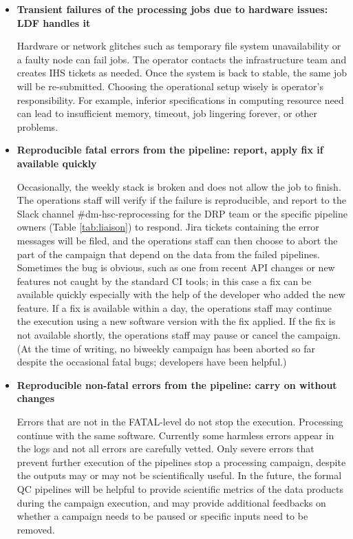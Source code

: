\documentclass[DM,authoryear,toc]{lsstdoc}
\begin{document}
\begin{itemize}
  \item \textbf{Transient failures of the processing jobs due to
  hardware issues: LDF handles it}

  Hardware or network glitches such as temporary file system
  unavailability or a faulty node can fail jobs. The operator
  contacts the infrastructure team and creates IHS tickets as needed.
  Once the system is back to stable, the same job will be re-submitted.
  Choosing the operational setup wisely is operator’s responsibility.
  For example, inferior specifications in computing resource need
  can lead to insufficient memory, timeout, job lingering forever,
  or other problems.

  \item \textbf{Reproducible fatal errors from the pipeline: report,
  apply fix if available quickly}

  Occasionally, the weekly stack is broken and does not allow the job to
  finish. The operations staff will verify if the failure is reproducible, and
  report to the Slack channel \#dm-hsc-reprocessing for the DRP team
  or the specific pipeline owners (Table \ref{tab:liaison})
  to respond. Jira tickets containing the error messages will be
  filed, and the operations staff can then choose to abort the
  part of the campaign that depend on the data from the failed
  pipelines.  Sometimes the bug is obvious, such as one from recent
  API changes or new features not caught by the standard CI tools;
  in this case a fix can be available quickly especially with the
  help of the developer who added the new feature.  If a fix is
  available within a day, the operations staff may continue the
  execution using a new software version with the fix applied.  If
  the fix is not available shortly, the operations staff may pause
  or cancel the campaign.
  (At the time of writing, no biweekly campaign has been aborted
  so far despite the occasional fatal bugs; developers have been
  helpful.)

  \item \textbf{Reproducible non-fatal errors from the pipeline:
  carry on without changes}

  Errors that are not in the FATAL-level do not stop the execution.
  Processing continue with the same software. Currently some harmless
  errors appear in the logs and not all errors are carefully vetted.
  Only severe errors that prevent further execution of the pipelines
  stop a processing campaign, despite the outputs may or may not
  be scientifically useful. In the future, the formal QC pipelines
  will be helpful to provide scientific metrics of the data products
  during the campaign execution, and may provide additional feedbacks
  on whether a campaign needs to be paused or specific inputs need
  to be removed.

\end{itemize}
\end{document}
